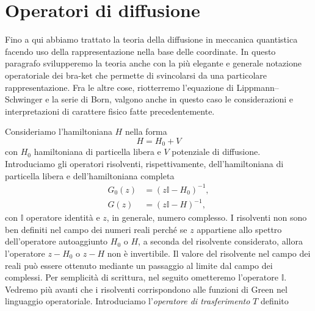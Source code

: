 \documentclass[a4paper,fleqn,twoside,12pt]{article}
\begin{document}
\section{Operatori di diffusione}
\label{sec:operatori-diffusione}

Fino a qui abbiamo trattato la teoria della diffusione in meccanica quantistica
facendo uso della rappresentazione nella base delle coordinate.  In questo
paragrafo svilupperemo la teoria anche con la più elegante e generale notazione
operatoriale dei bra-ket che permette di svincolarsi da una particolare
rappresentazione.  Fra le altre cose, riotterremo l'equazione di
Lippmann–Schwinger e la serie di Born, valgono anche in questo caso le
considerazioni e interpretazioni di carattere fisico fatte precedentemente.

Consideriamo l'hamiltoniana $H$ nella forma
\begin{equation}
  H = H_{0} + V
\end{equation}
con $H_{0}$ hamiltoniana di particella libera e $V$ potenziale di diffusione.
Introduciamo gli operatori risolventi, rispettivamente, dell'hamiltoniana di
particella libera e dell'hamiltoniana completa
\begin{subequations}
  \begin{align}
    G_{0}(z) &= (z\mathbb{I} - H_{0})^{-1}, \\
    G(z) &= (z\mathbb{I} - H)^{-1},
  \end{align}
\end{subequations}
con $\mathbb{I}$ operatore identità e $z$, in generale, numero complesso.  I
risolventi non sono ben definiti nel campo dei numeri reali perché se $z$
appartiene allo spettro dell'operatore autoaggiunto $H_{0}$ o $H$, a seconda del
risolvente considerato, allora l'operatore $z - H_{0}$ o $z - H$ non è
invertibile.  Il valore del risolvente nel campo dei reali può essere ottenuto
mediante un passaggio al limite dal campo dei complessi.  Per semplicità di
scrittura, nel seguito ometteremo l'operatore $\mathbb{I}$.  Vedremo più avanti
che i risolventi corrispondono alle funzioni di Green nel linguaggio
operatoriale.  Introduciamo l'\emph{operatore di trasferimento} $T$ definito
\end{document}
